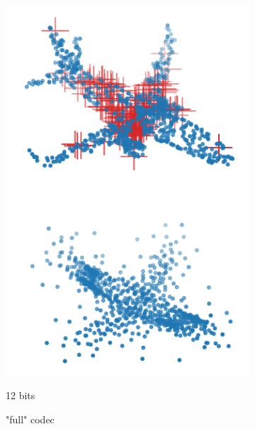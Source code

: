 \begin{figure}[t]
\begin{subfigure}[b]{\subfigureouterhspace}
\begin{subsubfigure}[b]{\subfigurehspace}
      \includegraphics[width=\linewidth]{img/point_cloud_compression/crit/test_airplane_0630/full_1.pdf}
      \includegraphics[width=\linewidth]{img/point_cloud_compression/rec/test_airplane_0630/full_1.pdf}
      \caption{12 bits}
      \label{fig:rec/full/1}
    \end{subsubfigure}%
    \caption{"full" codec}
  \end{subfigure}%
  \par%
  \vspace{1\baselineskip}%
  \begin{subfigure}[b]{\subfigureouterhspace}
    \setcounter{subsubfigure}{0}
    \centering
    \begin{subsubfigure}[b]{\subfigurehspace}

\end{subsubfigure}
\end{subfigure}
\end{figure}
